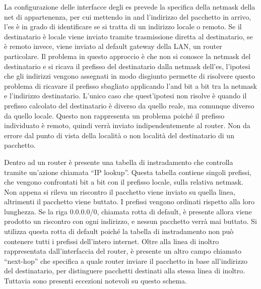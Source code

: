 \documentclass{article}
\numberwithin{equation}{subsection}
\begin{document}
La configurazione delle interfacce degli es prevede la specifica della netmask della net di appartenenza, per cui mettendo in and l'indirizzo del pacchetto in arrivo, 
l'es è in grado di identificare se si tratta di un indirizzo locale o remoto. Se il destinatario è locale viene inviato tramite trasmissione diretta al destinatario, 
se è remoto invece, viene inviato al default gateway della LAN, un router particolare. 
Il problema in questo approccio è che non si conosce la netmask del destinatario e si ricava il prefisso del destinatario dalla netmask dell'es, l'ipotesi che gli 
indirizzi vengono assegnati in modo disgiunto permette di risolvere questo problema di ricavare il prefisso sbagliato applicando l'and bit a bit tra la netmask e 
l'indirizzo destinatario. L'unico caso che quest'ipotesi non risolve è quando il prefisso calcolato del destinatario è diverso da quello reale, ma comunque diverso 
da quello locale. Questo non rappresenta un problema poiché il prefisso individuato è remoto, quindi verrà inviato indipendentemente al router. 
Non da errore dal punto di vista della località o non località del destinatario di un pacchetto. 

Dentro ad un router è presente una tabella di instradamento che controlla tramite un'azione chiamata ``IP lookup''. Questa tabella contiene singoli prefissi, che 
vengono confrontati bit a bit con il prefisso locale, sulla relativa netmask. Non appena si rileva un riscontro il pacchetto viene inviato su quella linea, 
altrimenti il pacchetto viene buttato. I prefissi vengono ordinati rispetto alla loro lunghezza. Se la riga 0.0.0.0/0, chiamata rotta di default,  è presente 
allora viene prodotto un riscontro con ogni indirizzo, e nessun pacchetto verrà mai buttato. 
Si utilizza questa rotta di default poiché la tabella di instradamento non può contenere tutti i prefissi dell'intero internet. 
Oltre alla linea di inoltro rappresentata dall'interfaccia del router, è presente un altro campo chiamato ``next-hop'' che specifica a quale router inviare il pacchetto 
in base all'indirizzo del destinatario, per distinguere pacchetti destinati alla stessa linea di inoltro. Tuttavia sono presenti eccezioni notevoli su questo schema. 
\end{document}
